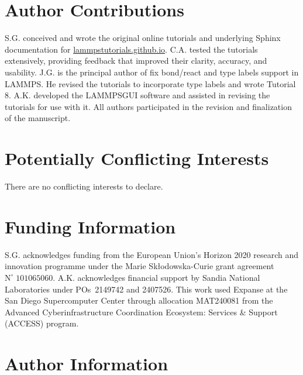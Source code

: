 \documentclass[9pt,tutorial]{livecoms}
\newcommand{\lmpcmd}[1]{\colorbox{listing}{\textcolor{command}{\small{#1}}}} %
\newcommand{\lammpsgui}{\textsf{LAMMPS\textendash GUI}}
\begin{document}
\section*{Author Contributions}

S.G. conceived and wrote the original online tutorials and underlying Sphinx documentation
for \href{https://lammpstutorials.github.io}{lammpstutorials.github.io}.  C.A. tested
the tutorials extensively, providing feedback that improved their clarity, accuracy, and usability.
J.G. is the principal author of \lmpcmd{fix bond/react} and \lmpcmd{type labels}
support in LAMMPS.  He revised the tutorials to incorporate type labels and wrote Tutorial 8.
A.K. developed the \lammpsgui{} software and assisted in revising the
tutorials for use with it.  All authors participated in the revision and finalization
of the manuscript.

\section*{Potentially Conflicting Interests}

There are no conflicting interests to declare.

\section*{Funding Information}

S.G. acknowledges funding from the European Union's Horizon 2020 research and
innovation programme under the Marie Skłodowska-Curie grant agreement $\text{N}^\circ\;101065060$.
A.K. acknowledges financial support by Sandia National Laboratories under
POs~2149742 and 2407526.  This work used Expanse at the San Diego Supercomputer
Center through allocation MAT240081 from the Advanced Cyberinfrastructure Coordination
Ecosystem: Services \& Support (ACCESS) program.

\section*{Author Information}
\makeorcid



\end{document}
